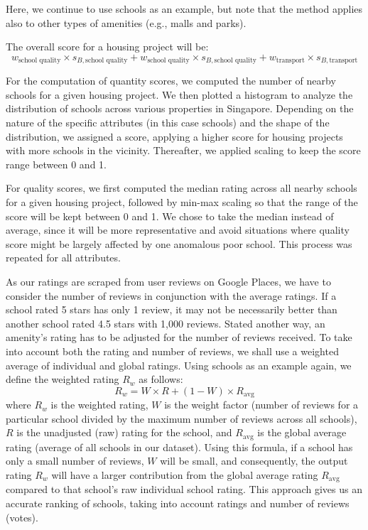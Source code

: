 \documentclass[a4paper, 11pt]{article}
\begin{document}
Here, we continue to use schools as an example, but note that the method applies also to other types of amenities (e.g., malls and parks).

The overall score for a housing project will be: \[ w_{\text{school quality}} \times s_{B,\text{school quality}} + w_{\text{school quality}} \times s_{B,\text{school quality}} + w_{\text{transport}} \times s_{B,\text{transport}} \]

For the computation of quantity scores, we computed the number of nearby schools for a given housing project. We then plotted a histogram to analyze the distribution of schools across various properties in Singapore. Depending on the nature of the specific attributes (in this case schools) and the shape of the distribution, we assigned a score, applying a higher score for housing projects with more schools in the vicinity. Thereafter, we applied scaling to keep the score range between 0 and 1. 

For quality scores, we first computed the median rating across all nearby schools for a given housing project, followed by min-max scaling so that the range of the score will be kept between 0 and 1. We chose to take the median instead of average, since it will be more representative and avoid situations where quality score might be largely affected by one anomalous poor school. This process was repeated for all attributes.

As our ratings are scraped from user reviews on Google Places, we have to consider the number of reviews in conjunction with the average ratings. If a school rated 5 stars has only 1 review, it may not be necessarily better than another school rated 4.5 stars with 1,000 reviews. Stated another way, an amenity's rating has to be adjusted for the number of reviews received. To take into account both the rating and number of reviews, we shall use a weighted average of individual and global ratings. Using schools as an example again, we define the weighted rating $R_w$ as follows:
\[ R_w = W\times R +(1-W)\times R_{\text{avg}}\] where $R_w$ is the weighted rating, $W$ is the weight factor (number of reviews for a particular school divided by the maximum number of reviews across all schools), $R$ is the unadjusted (raw) rating for the school, and $R_{\text{avg}}$ is the global average rating (average of all schools in our dataset). Using this formula, if a school has only a small number of reviews, $W$ will be small, and consequently, the output rating $R_w$ will have a larger contribution from the global average rating $R_{\text{avg}}$ compared to that school's raw individual school rating. This approach gives us an accurate ranking of schools, taking into account ratings and number of reviews (votes).
\end{document}
